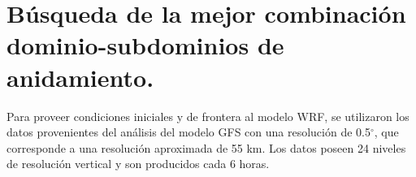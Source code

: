 %
%


\section{Búsqueda de la mejor combinación dominio-subdominios de anidamiento.}

Para proveer condiciones iniciales y de frontera al modelo WRF, se utilizaron los datos provenientes del análisis del modelo GFS con una resolución de 0.5$^{\circ}$, que corresponde a una resolución aproximada de 55 km. Los datos poseen 24 niveles de resolución vertical y son producidos cada 6 horas.\\

